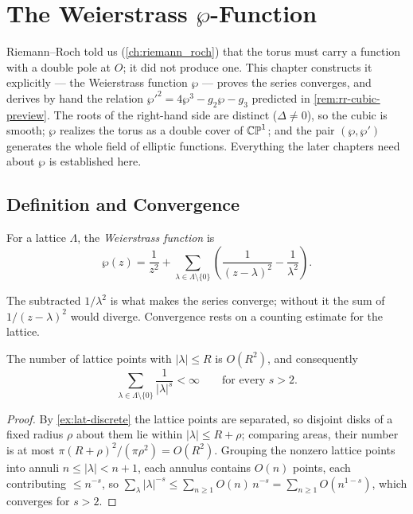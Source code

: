 \chapter{The Weierstrass \texorpdfstring{$\wp$}{wp}-Function}
\label{ch:weierstrass_wp}

Riemann--Roch told us (\cref{ch:riemann_roch}) that the torus must carry a
function with a double pole at \(O\); it did not produce one. This chapter
constructs it explicitly --- the Weierstrass function \(\wp\) --- proves the
series converges, and derives by hand the relation
\(\wp'^2 = 4\wp^3 - g_2\wp - g_3\) predicted in \cref{rem:rr-cubic-preview}. The
roots of the right-hand side are distinct (\(\Delta \ne 0\)), so the cubic is
smooth; \(\wp\) realizes the torus as a double cover of \(\mathbb{CP}^1\); and the pair
\((\wp, \wp')\) generates the whole field of elliptic functions. Everything the
later chapters need about \(\wp\) is established here.

\section{Definition and Convergence}
\label{sec:wp-def}

\begin{definition}
\label{def:wp}
For a lattice \(\Lambda\), the \emph{Weierstrass function} is
\[
  \wp(z) = \frac{1}{z^2}
  + \sum_{\lambda \in \Lambda \setminus \{0\}}
    \left( \frac{1}{(z-\lambda)^2} - \frac{1}{\lambda^2} \right).
\]
\end{definition}

The subtracted \(1/\lambda^2\) is what makes the series converge; without it the
sum of \(1/(z-\lambda)^2\) would diverge. Convergence rests on a counting
estimate for the lattice.

\begin{lemma}
\label{lem:wp-latsum}
The number of lattice points with \(|\lambda| \le R\) is \(O(R^2)\), and
consequently
\[
  \sum_{\lambda \in \Lambda \setminus \{0\}} \frac{1}{|\lambda|^{s}} < \infty
  \qquad\text{for every } s > 2 .
\]
\end{lemma}

\begin{proof}
By \cref{ex:lat-discrete} the lattice points are separated, so disjoint disks of
a fixed radius \(\rho\) about them lie within \(|\lambda| \le R + \rho\); comparing
areas, their number is at most \(\pi(R+\rho)^2/(\pi\rho^2) = O(R^2)\). Grouping
the nonzero lattice points into annuli \(n \le |\lambda| < n+1\), each annulus
contains \(O(n)\) points, each contributing \(\le n^{-s}\), so
\(\sum_\lambda |\lambda|^{-s} \le \sum_{n\ge 1} O(n)\,n^{-s}
= \sum_{n \ge 1} O(n^{1-s})\), which converges for \(s > 2\).
\end{proof}

